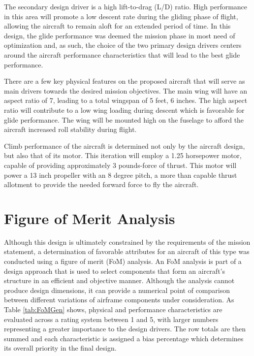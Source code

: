 \documentclass[titlepage]{article}
\begin{document}
The secondary design driver is a high lift-to-drag (L/D) ratio. High performance in this area will promote a low descent rate during the gliding phase of flight, allowing the aircraft to remain aloft for an extended period of time. In this design, the glide performance was deemed the mission phase in most need of optimization and, as such, the choice of the two primary design drivers centers around the aircraft performance characteristics that will lead to the best glide performance.

There are a few key physical features on the proposed aircraft that will serve as main drivers towards the desired mission objectives. The main wing will have an aspect ratio of 7, leading to a total wingspan of 5 feet, 6 inches. The high aspect ratio will contribute to a low wing loading during descent which is favorable for glide performance. The wing will be mounted high on the fuselage to afford the aircraft increased roll stability during flight. 

Climb performance of the aircraft is determined not only by the aircraft design, but also that of its motor. This iteration will employ a 1.25 horsepower motor, capable of providing approximately 3 pounds-force of thrust. This motor will power a 13 inch propeller with an 8 degree pitch, a more than capable thrust allotment to provide the needed forward force to fly the aircraft. 

\section{Figure of Merit Analysis}
Although this design is ultimately constrained by the requirements of the mission statement, a determination of favorable attributes for an aircraft of this type was conducted using a figure of merit (FoM) analysis. An FoM analysis is part of a design approach that is used to select components that form an aircraft's structure in an efficient and objective manner. Although the analysis cannot produce design dimensions, it can provide a numerical point of comparison between different variations of airframe components under consideration. As Table \ref{tab:FoMGen} shows, physical and performance characteristics are evaluated across a rating system between 1 and 5, with larger numbers representing a greater importance to the design drivers. The row totals are then summed and each characteristic is assigned a bias percentage which determines its overall priority in the final design. 
\end{document}
